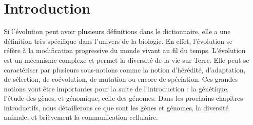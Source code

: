 \chapter{Introduction}
\thispagestyle{firstpage}
\onehalfspacing
\setcounter{page}{1}

\par Si l’évolution peut avoir plusieurs définitions dans le dictionnaire, elle a une définition très spécifique dans l’univers de la biologie. En effet, l'évolution se réfère à la modification progressive du monde vivant au fil du temps. L’évolution est un mécanisme complexe et permet la diversité de la vie sur Terre. Elle peut se caractériser par plusieurs sous-notions comme la notion d’hérédité, d’adaptation, de sélection, de coévolution, de mutation ou encore de spéciation. Ces grandes notions vont être importantes pour la suite de l’introduction : la génétique, l’étude des gènes, et génomique, celle des génomes. Dans les prochains chapitres introductifs, nous détaillerons ce que sont les gènes et génomes, la diversité animale, et brièvement la communication cellulaire. 

